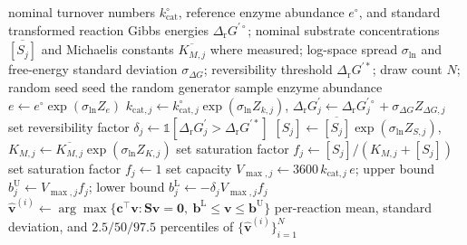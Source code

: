 \begin{algorithm}[htbp]
  \caption{Monte Carlo propagation of urea-cycle parameter uncertainty}
  \label{alg:uq}
  \begin{algorithmic}[1]
    \Require nominal turnover numbers $k^{\circ}_{\mathrm{cat}}$, reference
      enzyme abundance $e^{\circ}$, and standard transformed reaction Gibbs
      energies $\Delta_{\mathrm r}G^{\prime\circ}$; nominal substrate concentrations
      $\overline{[S_j]}$ and Michaelis constants $\overline{K_{M,j}}$ where
      measured; log-space spread $\sigma_{\ln}$ and free-energy standard
      deviation $\sigma_{\Delta G}$; reversibility threshold
      $\Delta_{\mathrm r}G^{\prime *}$;
      draw count $N$; random seed
    \State seed the random generator
      \State sample enzyme abundance $e \gets e^{\circ}\exp(\sigma_{\ln} Z_e)$
        \State $k_{\mathrm{cat},j} \gets k^{\circ}_{\mathrm{cat},j}\exp(\sigma_{\ln} Z_{k,j})$,
          \quad $\Delta_{\mathrm r}G_j^{\prime} \gets
          \Delta_{\mathrm r}G_j^{\prime\circ} + \sigma_{\Delta G} Z_{\Delta G,j}$
        \State set reversibility factor
          $\delta_j \gets \mathbb{1}[\Delta_{\mathrm r}G_j^{\prime} >
          \Delta_{\mathrm r}G^{\prime *}]$
          \State $[S_j] \gets \overline{[S_j]}\exp(\sigma_{\ln} Z_{S,j})$,
            \quad $K_{M,j} \gets \overline{K_{M,j}}\exp(\sigma_{\ln} Z_{K,j})$
          \State set saturation factor
            $f_j \gets [S_j]/(K_{M,j}+[S_j])$
        \Else
          \State set saturation factor $f_j \gets 1$
        \EndIf
        \State set capacity $V_{\max,j} \gets 3600\,k_{\mathrm{cat},j}\,e$;
          upper bound $b_j^{\mathrm U} \gets V_{\max,j} f_j$;
          lower bound $b_j^{\mathrm L} \gets -\delta_j V_{\max,j} f_j$
      \EndFor
      \State $\hat{\mathbf v}^{(i)} \gets
        \arg\max\{\mathbf c^{\top}\mathbf v : \mathbf S\mathbf v = \mathbf 0,\
        \mathbf b^{\mathrm L} \le \mathbf v \le \mathbf b^{\mathrm U}\}$
    \EndFor
    \State \Return per-reaction mean, standard deviation, and $2.5/50/97.5$
      percentiles of $\{\hat{\mathbf v}^{(i)}\}_{i=1}^{N}$
  \end{algorithmic}
\end{algorithm}

